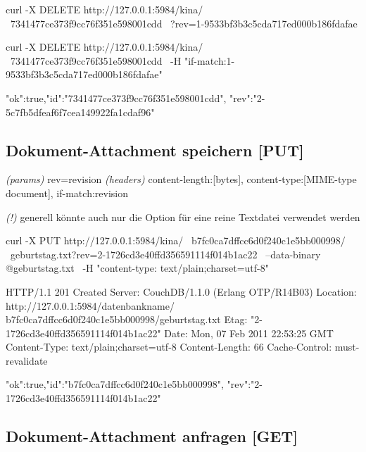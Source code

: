 \documentclass[19pt,landscape,twocolumn]{article}
\newcommand{\mono}[1]{\texttt{\textendash\textendash {#1}}}
\newcommand{\htmlverb}[1]{{[}\textbf{{#1}}{]}}
\newcommand{\brackets}[1]{{[}{#1}{]}}
\newcommand{\setparskip}{\setlength{\parskip}{-6mm}}
\newcommand{\resetparskip}{\setlength{\parskip}{1mm}}
\begin{document}
\begin{code}
curl -X DELETE http://127.0.0.1:5984/kina/ \
  7341477ce373f9cc76f351e598001cdd \
  ?rev=1-9533bf3b3c5cda717ed000b186fdafae
\end{code}

\begin{code}
curl -X DELETE http://127.0.0.1:5984/kina/ \
  7341477ce373f9cc76f351e598001cdd \
  -H "if-match:1-9533bf3b3c5cda717ed000b186fdafae"
\end{code}
\setparskip
\begin{response}
{"ok":true,"id":"7341477ce373f9cc76f351e598001cdd",
 "rev":"2-5c7fb5dfeaf6f7cea149922fa1cdaf96"}
\end{response}
\resetparskip

\subsection{Dokument-Attachment speichern \htmlverb{PUT}}
\emph{(params)} rev=revision \newline
\emph{(headers)} content-length:\brackets{bytes}, content-type:\brackets{MIME-type document}, if-match:revision

\emph{(!)} generell könnte auch nur die Option \mono{data} für eine reine Textdatei \newline
verwendet werden

\begin{code}
curl -X PUT http://127.0.0.1:5984/kina/ \
  b7fc0ca7dffcc6d0f240c1e5bb000998/ \
  geburtstag.txt?rev=2-1726cd3e40ffd356591114f014b1ac22 \
     --data-binary @geburtstag.txt \
     -H "content-type: text/plain;charset=utf-8"
\end{code}
\setparskip
\begin{response}
HTTP/1.1 201 Created
Server: CouchDB/1.1.0 (Erlang OTP/R14B03)
Location: http://127.0.0.1:5984/datenbankname/
  b7fc0ca7dffcc6d0f240c1e5bb000998/geburtstag.txt
Etag: "2-1726cd3e40ffd356591114f014b1ac22"
Date: Mon, 07 Feb 2011 22:53:25 GMT
Content-Type: text/plain;charset=utf-8
Content-Length: 66
Cache-Control: must-revalidate

{"ok":true,"id":"b7fc0ca7dffcc6d0f240c1e5bb000998",
 "rev":"2-1726cd3e40ffd356591114f014b1ac22"}
\end{response}
\resetparskip

\subsection{Dokument-Attachment anfragen \htmlverb{GET}}
\end{document}
